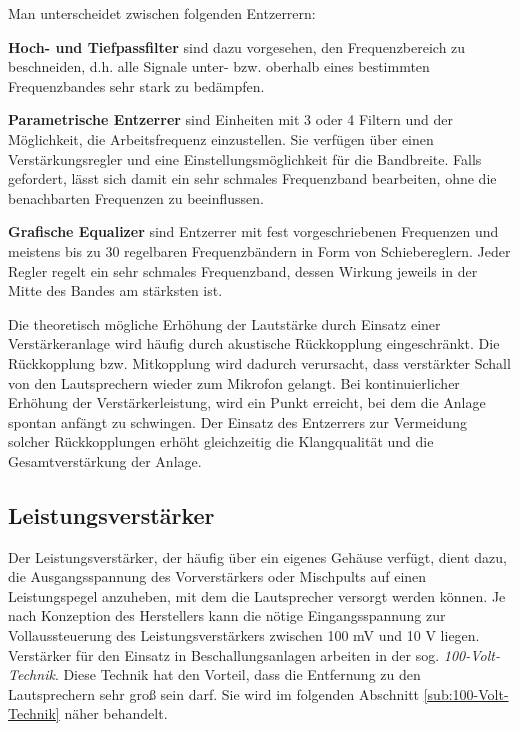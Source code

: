 Man unterscheidet zwischen folgenden Entzerrern:
\begin{compactenum}
\item \textbf{Hoch- und Tiefpassfilter} sind dazu vorgesehen, den Frequenzbereich zu beschneiden, d.h. alle Signale unter- bzw. oberhalb eines bestimmten Frequenzbandes sehr stark zu bedämpfen.
\item \textbf{Parametrische Entzerrer} sind Einheiten mit 3 oder 4 Filtern und der Möglichkeit, die Arbeitsfrequenz einzustellen. Sie verfügen über einen Verstärkungsregler und eine Einstellungsmöglichkeit für die Bandbreite. Falls gefordert, lässt sich damit ein sehr schmales Frequenzband bearbeiten, ohne die benachbarten Frequenzen zu beeinflussen.
\item \textbf{Grafische Equalizer} sind Entzerrer mit fest vorgeschriebenen Frequenzen und meistens bis zu 30 regelbaren Frequenzbändern in Form von Schiebereglern. Jeder Regler regelt ein sehr schmales Frequenzband, dessen Wirkung jeweils in der Mitte des Bandes am stärksten ist.
\end{compactenum}

Die theoretisch mögliche Erhöhung der Lautstärke durch Einsatz einer Verstärkeranlage wird häufig durch akustische Rückkopplung eingeschränkt. Die Rückkopplung bzw. Mitkopplung wird dadurch verursacht, dass verstärkter Schall von den Lautsprechern wieder zum Mikrofon gelangt. Bei kontinuierlicher Erhöhung der Verstärkerleistung, wird ein Punkt erreicht, bei dem die Anlage spontan anfängt zu schwingen. Der Einsatz des Entzerrers zur Vermeidung solcher Rückkopplungen erhöht gleichzeitig die Klangqualität und die Gesamtverstärkung der Anlage.

\subsection{Leistungsverstärker}
\label{sub:Leistungsverstaerker}
Der Leistungsverstärker, der häufig über ein eigenes Gehäuse verfügt, dient dazu, die Ausgangsspannung des Vorverstärkers oder Mischpults auf einen Leistungspegel anzuheben, mit dem die Lautsprecher versorgt werden können. Je nach Konzeption des Herstellers kann die nötige Eingangsspannung zur Vollaussteuerung des Leistungsverstärkers zwischen 100 mV und 10 V liegen.
Verstärker für den Einsatz in Beschallungsanlagen arbeiten in der sog. \textit{100-Volt-Technik}. Diese Technik hat den Vorteil, dass die Entfernung zu den Lautsprechern sehr groß sein darf. Sie wird im folgenden Abschnitt \ref{sub:100-Volt-Technik} näher behandelt.

